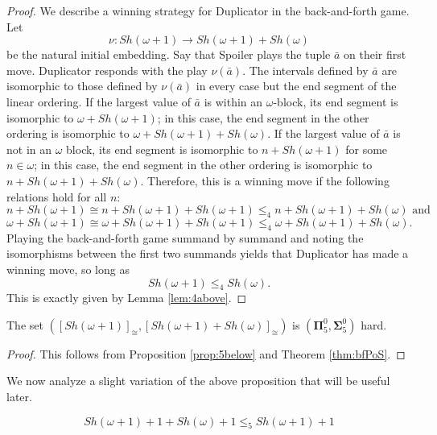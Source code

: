 \documentclass[11pt]{amsart}
\theoremstyle{definition}
\begin{document}
\begin{proof}
We describe a winning strategy for Duplicator in the back-and-forth game.
Let 
\[\nu: Sh(\omega+1)\to Sh(\omega+1)+Sh(\omega)\]
be the natural initial embedding.
Say that Spoiler plays the tuple $\bar{a}$ on their first move.
Duplicator responds with the play $\nu(\bar{a})$.
The intervals defined by $\bar{a}$ are isomorphic to those defined by $\nu(\bar{a})$ in every case but the end segment of the linear ordering.
If the largest value of $\bar{a}$ is within an $\omega$-block, its end segment is isomorphic to $\omega+Sh(\omega+1)$; in this case, the end segment in the other ordering is isomorphic to $\omega+Sh(\omega+1)+Sh(\omega)$.
If the largest value of $\bar{a}$ is not in an $\omega$ block, its end segment is isomorphic to $n+Sh(\omega+1)$ for some $n\in\omega$; in this case, the end segment in the other ordering is isomorphic to $n+Sh(\omega+1)+Sh(\omega)$.
Therefore, this is a winning move if the following relations hold for all $n$:
\[n+Sh(\omega+1)\cong n+Sh(\omega+1)+Sh(\omega+1)\leq_4 n+Sh(\omega+1)+Sh(\omega)
 \text{  and  } 
\]
\[
\omega+Sh(\omega+1)\cong \omega+Sh(\omega+1)+Sh(\omega+1)\leq_4 \omega+Sh(\omega+1)+Sh(\omega).
\]
Playing the back-and-forth game summand by summand and noting the isomorphisms between the first two summands yields that Duplicator has made a winning move, so long as
\[
Sh(\omega+1)\leq_4 Sh(\omega).
\]
This is exactly given by Lemma \ref{lem:4above}.


\end{proof}

\begin{corollary}\label{cor:5hard}
The set $([Sh(\omega+1)]_\cong,[Sh(\omega+1)+Sh(\omega)]_\cong)$ is $(\mathbf{\Pi}_5^0,\mathbf{\Sigma}_5^0)$ hard.
\end{corollary}

\begin{proof}
This follows from Proposition \ref{prop:5below} and Theorem \ref{thm:bfPoS}.
\end{proof}

We now analyze a slight variation of the above proposition that will be useful later.

\begin{proposition}\label{prop:5belowV2}
\[Sh(\omega+1)+1+Sh(\omega)+1 \leq_5 Sh(\omega+1)+1 \]
\end{proposition}
\end{document}

